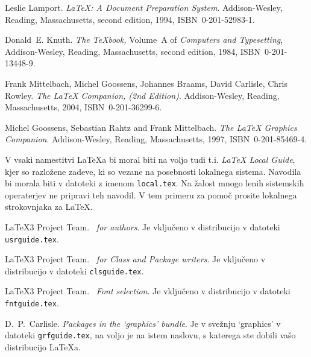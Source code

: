 \begin{thebibliography}{99}
 Leslie Lamport.  \newblock \emph{{\LaTeX:} A Document
    Preparation System}.  \newblock Addison-Wesley, Reading,
  Massachusetts, second edition, 1994, ISBN~0-201-52983-1.
  
 Donald~E. Knuth.  \newblock \textit{The \TeX{}book,}
  Volume~A of \textit{Computers and Typesetting}, Addison-Wesley,
  Reading, Massachusetts, second edition, 1984, ISBN~0-201-13448-9.

 Frank Mittelbach, Michel Goossens, Johannes Braams,
  David Carlisle, Chris Rowley.  \newblock \emph{The {\LaTeX} Companion, (2nd Edition)}.  \newblock
  Addison-Wesley, Reading, Massachusetts, 2004, ISBN~0-201-36299-6.

 Michel Goossens, Sebastian Rahtz and Frank
  Mittelbach.  \newblock \emph{The {\LaTeX} Graphics Companion}.  \newblock
  Addison-Wesley, Reading, Massachusetts, 1997, ISBN~0-201-85469-4.
 
 V vsaki namestitvi \LaTeX{}a bi moral biti na 
voljo tudi t.i.{}
  \emph{\LaTeX{} Local Guide}, kjer so razložene zadeve, ki so 
vezane na posebnosti lokalnega sistema. Navodila bi morala biti
v datoteki z imenom 
  \texttt{local.tex}. Na žalost mnogo lenih sistemskih operaterjev ne pripravi teh navodil. V tem primeru za pomoč prosite lokalnega strokovnjaka
za \LaTeX{}.

 \LaTeX3 Project Team.  \newblock \emph{\LaTeXe~for
    authors}.  \newblock Je vključeno v distribucijo \LaTeXe{} 
   v datoteki \texttt{usrguide.tex}.

 \LaTeX3 Project Team.  \newblock \emph{\LaTeXe~for
    Class and Package writers}.  \newblock Je vključeno v distribucijo \LaTeXe{} 
   v datoteki  \texttt{clsguide.tex}.

 \LaTeX3 Project Team.  \newblock \emph{\LaTeXe~Font
    selection}.  \newblock Je vključeno v distribucijo \LaTeXe{} 
   v datoteki 
  \texttt{fntguide.tex}.

 D.~P.~Carlisle.  \newblock \emph{Packages in the
    `graphics' bundle}.  \newblock Je v svežnju `graphics' v datoteki
  \texttt{grfguide.tex}, na voljo je na istem naslovu, s katerega ste
dobili vašo distribucijo \LaTeX{}a.


\end{thebibliography}
